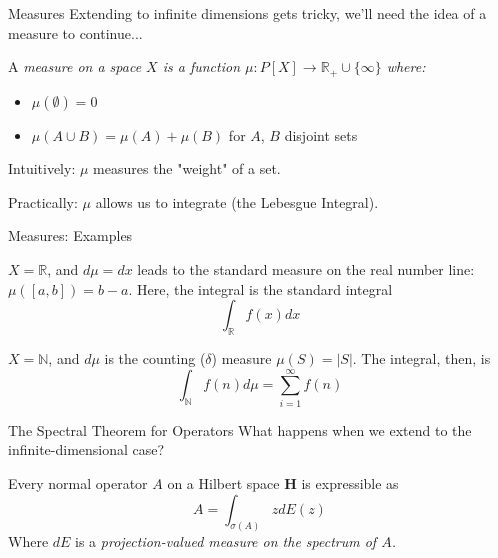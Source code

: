 \documentclass{beamer}
\begin{document}
\begin{frame}{Measures}
    Extending to infinite dimensions gets tricky, we'll need the idea of a
    measure to continue...
    \pause
    
    A \em measure \em on a space $X$ is a function $\mu: P[X] \to
    \mathbb{R}_+\cup\{\infty\}$
    where:
        \begin{itemize}
            \item $\mu(\emptyset) = 0$
            \item $\mu(A\cup B) = \mu(A) + \mu(B)$ for $A$, $B$ disjoint sets
        \end{itemize}
        \pause
    Intuitively: $\mu$ measures the "weight" of a set.
        \pause

    Practically: $\mu$ allows us to integrate (the Lebesgue Integral).
\end{frame}
\begin{frame}{Measures: Examples}
    \begin{example}
        $X = \mathbb{R}$, and $d\mu = dx$ leads to the standard measure on the
        real number line: $\mu([a,b]) = b-a$. Here, the integral is the standard
        integral
            \[
                \int_{\mathbb{R}}f(x)dx
            \]
    \end{example}
    \pause
    \begin{example}
        $X = \mathbb{N}$, and $d\mu$ is the counting ($\delta$) measure $\mu(S) =
        |S|$. The integral, then, is
        \[
            \int_{\mathbb{N}}f(n)d\mu = \sum_{i=1}^{\infty}f(n)
        \]
    \end{example}

\end{frame}
\begin{frame}{The Spectral Theorem for Operators}
    What happens when we extend to the infinite-dimensional case?

    \begin{theorem}
        Every normal operator $A$ on a Hilbert space \textbf{H} is expressible
        as
        \[
            A = \int_{\sigma(A)} zdE(z)
        \]
        Where $dE$ is a \em projection-valued measure \em on the spectrum of
        $A$.
    \end{theorem}
\end{frame}
\end{document}
